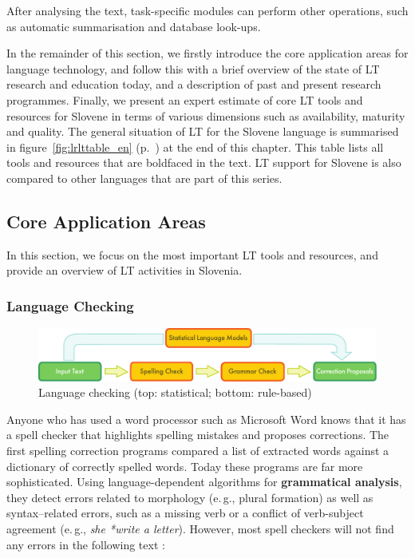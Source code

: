 \begin{multicols}{2}
After analysing the text, task-specific modules can perform other operations, such as automatic summarisation and database look-ups.

In the remainder of this section, we firstly introduce the core application areas for language technology, and follow this with a brief overview of the state of LT research and education today, and a description of past and present research programmes. Finally, we present an expert estimate of core LT tools and resources for Slovene in terms of various dimensions such as availability, maturity and quality. The general situation of LT for the Slovene language is summarised in figure~\ref{fig:lrlttable_en} (p.~\pageref{fig:lrlttable_en}) at the end of this chapter. This table lists all tools and resources that are boldfaced in the text. LT support for Slovene is also compared to other languages that are part of this series.

\subsection{Core Application Areas}

In this section, we focus on the most important LT tools and resources, and provide an overview of LT activities in Slovenia. 

\subsubsection{Language Checking}

\begin{figure}[t!]
  \center
  \includegraphics[width=\textwidth]{../_media/english/language_checking}
  \caption{Language checking (top: statistical; bottom: rule-based)}
\label{fig:langcheckingaarch_en}
\end{figure}

Anyone who has used a word processor such as Microsoft Word knows that it has a spell checker that highlights spelling mistakes and proposes corrections. The first spelling correction programs compared a list of extracted words against a dictionary of correctly spelled words. Today these programs are far more sophisticated. Using language-dependent algorithms for \textbf{grammatical analysis}, they detect errors related to morphology (e.\,g., plural formation) as well as syntax–related errors, such as a missing verb or a conflict of verb-subject agreement (e.\,g., \textit{she *write a letter}). However, most spell checkers will not find any errors in the following text \cite{zar1}:


\end{multicols}

